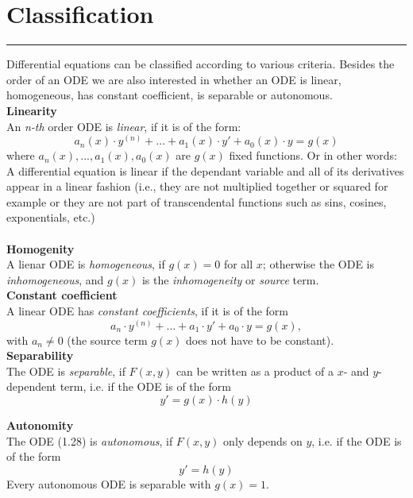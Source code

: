 \section{Classification}
\noindent\rule[\linienAbstand]{\linewidth}{\linienDickeDick}

Differential equations can be classified according to various criteria. Besides the order of an ODE we are also interested in whether an ODE is linear, homogeneous, has constant coefficient, is separable or autonomous.\\

\textbf{Linearity}\\
An \emph{n-th} order ODE is \emph{linear}, if it is of the form:
\begin{equation}
  a_n(x) \cdot y^{(n)} + ... + a_1(x) \cdot y' + a_0(x) \cdot y = g(x)
\end{equation}
where $a_n(x), ..., a_1(x), a_0(x)$ are $g(x)$ fixed functions. Or in other words: A differential equation is linear if the dependant variable and all of its derivatives appear in a linear fashion (i.e., they are not multiplied together or squared for example or they are not part of transcendental functions such as sins, cosines, exponentials, etc.)\\\\

\textbf{Homogenity}\\
A lienar ODE is \emph{homogeneous}, if $g(x) = 0$ for all $x$; otherwise the ODE is \emph{inhomogeneous}, and $g(x)$ is the \emph{inhomogeneity} or \emph{source} term.\\

\textbf{Constant coefficient}\\
A linear ODE has \emph{constant coefficients}, if it is of the form
\begin{equation}
  a_n \cdot y^{(n)} + ... + a_1 \cdot y'+ a_0 \cdot y = g(x),
\end{equation}
with $a_n \neq 0$ (the source term $g(x)$ does not have to be constant).\\

\textbf{Separability}\\
The ODE is \emph{separable}, if $F(x, y)$ can be written as a product of a $x$- and $y$-dependent term, i.e. if the ODE is of the form
\begin{equation}
  y' = g(x) \cdot h(y)
\end{equation}

\textbf{Autonomity}\\
The ODE (1.28) is \emph{autonomous}, if $F(x, y)$ only depends on $y$, i.e. if the ODE is of the form
\begin{equation}
  y' = h(y)
\end{equation}
Every autonomous ODE is separable with $g(x) = 1$.\\

